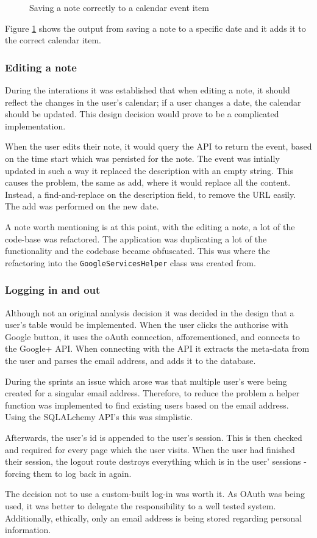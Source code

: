 \begin{figure}[H]
  \centering
  \label{fig:saved_to_calendar}
  \caption{Saving a note correctly to a calendar event item}
\end{figure}

Figure \ref{fig:saved_to_calendar} shows the output from saving a note to a specific date and it adds it to the correct calendar item.

\subsubsection{Editing a note}
During the interations it was established that when editing a note, it should reflect the changes in the user's calendar; if a user changes a date, the calendar should be updated. This design decision would prove to be a complicated implementation.

When the user edits their note, it would query the API to return the event, based on the time start which was persisted for the note. The event was intially updated in such a way it replaced the description with an empty string. This causes the problem, the same as add, where it would replace all the content. Instead, a find-and-replace on the description field, to remove the URL easily. The add was performed on the new date.

A note worth mentioning is at this point, with the editing a note, a lot of the code-base was refactored. The application was duplicating a lot of the functionality and the codebase became obfuscated. This was where the refactoring into the \texttt{GoogleServicesHelper} class was created from.

\subsubsection{Logging in and out}
Although not an original analysis decision it was decided in the design that a user's table would be implemented. When the user clicks the authorise with Google button, it uses the oAuth connection, afforementioned, and connects to the Google+ API. When connecting with the API it extracts the meta-data from the user and parses the email address, and adds it to the database.

During the sprints an issue which arose was that multiple user's were being created for a singular email address. Therefore, to reduce the problem a helper function was implemented to find existing users based on the email address. Using the SQLALchemy API's this was simplistic.

Afterwards, the user's id is appended to the user's session. This is then checked and required for every page which the user visits. When the user had finished their session, the logout route destroys everything which is in the user' sessions - forcing them to log back in again.

The decision not to use a custom-built log-in was worth it. As OAuth was being used, it was better to delegate the responsibility to a well tested system. Additionally, ethically, only an email address is being stored regarding personal information.

